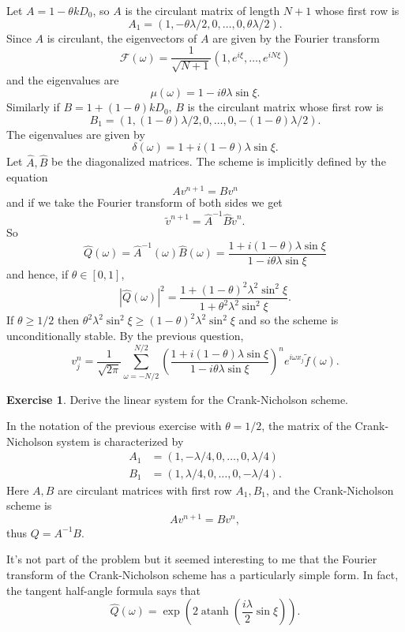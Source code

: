 \documentclass[10pt]{article}
\DeclareMathOperator{\atanh}{atanh}
\theoremstyle{definition}
\newtheorem{exer}{Exercise}
\begin{document}
Let $A = 1 - \theta kD_0$, so $A$ is the circulant matrix of length $N + 1$ whose first row is
$$A_1 = (1, -\theta \lambda/2, 0, \dots, 0, \theta \lambda/2).$$
Since $A$ is circulant, the eigenvectors of $A$ are given by the Fourier transform
$$\mathcal F(\omega) = \frac{1}{\sqrt{N + 1}} (1, e^{i\xi}, \dots, e^{iN\xi})$$
and the eigenvalues are
$$\mu(\omega) = 1 - i\theta \lambda \sin \xi.$$
Similarly if $B = 1 + (1 - \theta)k D_0$, $B$ is the circulant matrix whose first row is
$$B_1 = (1, (1 - \theta)\lambda/2, 0, \dots, 0, -(1 - \theta)\lambda/2).$$
The eigenvalues are given by
$$\delta(\omega) = 1 + i(1 - \theta)\lambda \sin \xi.$$
Let $\hat A, \hat B$ be the diagonalized matrices.
The scheme is implicitly defined by the equation
$$Av^{n+1} = Bv^n$$
and if we take the Fourier transform of both sides we get
$$\tilde v^{n + 1} = \hat A^{-1} \hat B \tilde v^n.$$
So
$$\hat Q(\omega) = \hat A^{-1}(\omega) \hat B(\omega) = \frac{1 + i(1 - \theta)\lambda \sin \xi}{1 - i\theta \lambda \sin \xi}$$
and hence, if $\theta \in [0, 1]$,
$$|\hat Q(\omega)|^2 = \frac{1 + (1 - \theta)^2\lambda^2 \sin^2 \xi}{1 + \theta^2 \lambda^2 \sin^2 \xi}.$$
If $\theta \geq 1/2$ then $\theta^2 \lambda^2 \sin^2 \xi \geq (1 - \theta)^2 \lambda^2 \sin^2 \xi$ and so the scheme is unconditionally stable.
By the previous question,
$$v^n_j = \frac{1}{\sqrt{2\pi}} \sum_{\omega = -N/2}^{N/2} \left(\frac{1 + i(1 - \theta)\lambda \sin \xi}{1 - i\theta \lambda \sin \xi}\right)^n e^{i\omega x_j} \tilde f(\omega).$$

\begin{exer}
Derive the linear system for the Crank-Nicholson scheme.
\end{exer}

In the notation of the previous exercise with $\theta = 1/2$, the matrix of the Crank-Nicholson system is characterized by
\begin{align*}
A_1 &= (1, -\lambda/4, 0, \dots, 0, \lambda/4)\\
B_1 &= (1, \lambda/4, 0, \dots, 0, -\lambda/4).
\end{align*}
Here $A,B$ are circulant matrices with first row $A_1,B_1$, and the Crank-Nicholson scheme is
$$Av^{n + 1} = Bv^n,$$
thus $Q = A^{-1}B$.

It's not part of the problem but it seemed interesting to me that the Fourier transform of the Crank-Nicholson scheme has a particularly simple form.
In fact, the tangent half-angle formula says that
$$\hat Q(\omega) = \exp\left(2 \atanh \left(\frac{i\lambda}{2} \sin \xi\right)\right).$$
\end{document}
